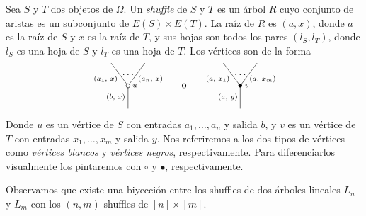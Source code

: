 \documentclass[../main.tex]{subfiles}
\begin{document}
\begin{defi}
    Sea $S$ y $T$ dos objetos de $\Omega$. Un \emph{shuffle} de $S$ y $T$ es un \'arbol $R$ cuyo conjunto de aristas es un subconjunto de $E(S)\times E(T)$. La ra\'iz de $R$ es $(a,x)$, donde $a$ es la ra\'iz de $S$ y $x$ es la ra\'iz de $T$,
    y sus hojas son todos los pares $(l_S,l_T)$, donde $l_S$ es una hoja de $S$ y $l_T$ es una hoja de $T$. Los v\'ertices son de la forma
    $$
        \xy
        <0.08cm, 0cm>:
        (0.0, 0.0)*{}="1"; %
        (0.0, 10.0)*\cir<2pt>{}="2"; %
        (-7.5, 20.0)*{}="3"; %
        (7.5, 20.0)*{}="4"; %
        "1";"2" **\dir{-};
        "2";"3" **\dir{-};
        "2";"4" **\dir{-};
        (3.0, 10.0)*=0{\scriptstyle u};
        (-5.5, 5)*=0{\scriptstyle (b,\text{ }x)};
        (-10, 13.0)*=0{\scriptstyle (a_1,\text{ }x)};
        (10, 13.0)*=0{\scriptstyle (a_n,\text{ }x)};
        (0,15)*{\dots};
        \endxy
        \xy
        <0.08cm, 0cm>:
        (-15, 0.0)*{}="1";
        (15, 10.0)*{}="2";
        (0,10)*{\rm o};
        \endxy
        \xy
        <0.08cm, 0cm>:
        (0.0, 0.0)*{}="1"; %
        (0.0, 10.0)*=0{\bullet}="2"; %
        (-7.5, 20.0)*{}="3"; %
        (7.5, 20.0)*{}="4"; %
        "1";"2" **\dir{-};
        "2";"3" **\dir{-};
        "2";"4" **\dir{-};
        (3.0, 10.0)*=0{\scriptstyle v};
        (-5.5, 5)*=0{\scriptstyle (a,\text{ }y)};
        (-10, 13.0)*=0{\scriptstyle (a,\text{ }x_1)};
        (10, 13.0)*=0{\scriptstyle (a,\text{ }x_m)};
        (0,15)*{\dots};
        \endxy
    $$
    Donde $u$ es un v\'ertice de $S$ con entradas $a_1,\dots,a_n$ y salida $b$, y $v$ es un v\'ertice de $T$ con entradas $x_1,\dots,x_m$ y salida $y$. Nos referiremos a los dos tipos de v\'ertices como \emph{v\'ertices blancos} y \emph{v\'ertices negros}, respectivamente. Para diferenciarlos visualmente los pintaremos con $\circ$ y $\bullet$, respectivamente.

    Observamos que existe una biyecci\'on entre los shuffles de dos \'arboles lineales $L_n$ y $L_m$ con los $(n,m)$-shuffles de $[n]\times[m]$.
\end{defi}
\end{document}
